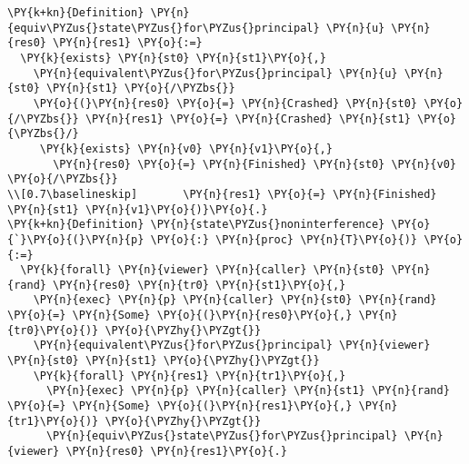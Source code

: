 \begin{BVerbatim}[commandchars=\\\{\},codes={\catcode`\$=3\catcode`\^=7\catcode`\_=8},fontsize=\footnotesize]
\PY{k+kn}{Definition} \PY{n}{equiv\PYZus{}state\PYZus{}for\PYZus{}principal} \PY{n}{u} \PY{n}{res0} \PY{n}{res1} \PY{o}{:=}
  \PY{k}{exists} \PY{n}{st0} \PY{n}{st1}\PY{o}{,}
    \PY{n}{equivalent\PYZus{}for\PYZus{}principal} \PY{n}{u} \PY{n}{st0} \PY{n}{st1} \PY{o}{/\PYZbs{}}
    \PY{o}{(}\PY{n}{res0} \PY{o}{=} \PY{n}{Crashed} \PY{n}{st0} \PY{o}{/\PYZbs{}} \PY{n}{res1} \PY{o}{=} \PY{n}{Crashed} \PY{n}{st1} \PY{o}{\PYZbs{}/}
     \PY{k}{exists} \PY{n}{v0} \PY{n}{v1}\PY{o}{,}
       \PY{n}{res0} \PY{o}{=} \PY{n}{Finished} \PY{n}{st0} \PY{n}{v0} \PY{o}{/\PYZbs{}}
\\[0.7\baselineskip]       \PY{n}{res1} \PY{o}{=} \PY{n}{Finished} \PY{n}{st1} \PY{n}{v1}\PY{o}{)}\PY{o}{.}
\PY{k+kn}{Definition} \PY{n}{state\PYZus{}noninterference} \PY{o}{`}\PY{o}{(}\PY{n}{p} \PY{o}{:} \PY{n}{proc} \PY{n}{T}\PY{o}{)} \PY{o}{:=}
  \PY{k}{forall} \PY{n}{viewer} \PY{n}{caller} \PY{n}{st0} \PY{n}{rand} \PY{n}{res0} \PY{n}{tr0} \PY{n}{st1}\PY{o}{,}
    \PY{n}{exec} \PY{n}{p} \PY{n}{caller} \PY{n}{st0} \PY{n}{rand} \PY{o}{=} \PY{n}{Some} \PY{o}{(}\PY{n}{res0}\PY{o}{,} \PY{n}{tr0}\PY{o}{)} \PY{o}{\PYZhy{}\PYZgt{}}
    \PY{n}{equivalent\PYZus{}for\PYZus{}principal} \PY{n}{viewer} \PY{n}{st0} \PY{n}{st1} \PY{o}{\PYZhy{}\PYZgt{}}
    \PY{k}{forall} \PY{n}{res1} \PY{n}{tr1}\PY{o}{,}
      \PY{n}{exec} \PY{n}{p} \PY{n}{caller} \PY{n}{st1} \PY{n}{rand} \PY{o}{=} \PY{n}{Some} \PY{o}{(}\PY{n}{res1}\PY{o}{,} \PY{n}{tr1}\PY{o}{)} \PY{o}{\PYZhy{}\PYZgt{}}
      \PY{n}{equiv\PYZus{}state\PYZus{}for\PYZus{}principal} \PY{n}{viewer} \PY{n}{res0} \PY{n}{res1}\PY{o}{.}
\end{BVerbatim}
